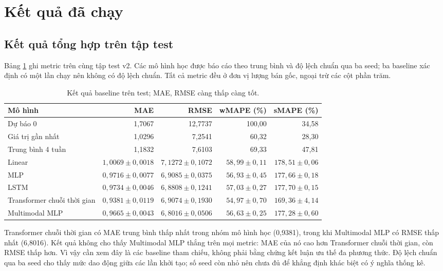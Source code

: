 \documentclass[12pt,a4paper,oneside]{article}
\begin{document}
\section{Kết quả đã chạy}
\subsection{Kết quả tổng hợp trên tập test}
Bảng \ref{tab:baseline} ghi metric trên cùng tập test v2. Các mô hình học được báo cáo theo trung bình và độ lệch chuẩn qua ba seed; ba baseline xác định có một lần chạy nên không có độ lệch chuẩn. Tất cả metric đều ở đơn vị lượng bán gốc, ngoại trừ các cột phần trăm.

\begin{table}[!htbp]
\centering
\small
\caption{Kết quả baseline trên test; MAE, RMSE càng thấp càng tốt.}
\label{tab:baseline}
\begin{tabular}{lrrrr}
\toprule
Mô hình & MAE & RMSE & wMAPE (\%) & sMAPE (\%) \\
\midrule
Dự báo 0 & 1,7067 & 12,7737 & 100,00 & 34,58 \\
Giá trị gần nhất & 1,0296 & 7,2541 & 60,32 & 28,30 \\
Trung bình 4 tuần & 1,1832 & 7,6103 & 69,33 & 47,81 \\
Linear & $1,0069\pm0,0018$ & $7,1272\pm0,1072$ & $58,99\pm0,11$ & $178,51\pm0,06$ \\
MLP & $0,9716\pm0,0077$ & $6,9085\pm0,0375$ & $56,93\pm0,45$ & $177,66\pm0,18$ \\
LSTM & $0,9734\pm0,0046$ & $6,8808\pm0,1241$ & $57,03\pm0,27$ & $177,70\pm0,15$ \\
Transformer chuỗi thời gian & $0,9381\pm0,0119$ & $6,9074\pm0,1930$ & $54,97\pm0,70$ & $169,36\pm4,14$ \\
Multimodal MLP & $0,9665\pm0,0043$ & $6,8016\pm0,0506$ & $56,63\pm0,25$ & $177,28\pm0,60$ \\
\bottomrule
\end{tabular}
\end{table}

Transformer chuỗi thời gian có MAE trung bình thấp nhất trong nhóm mô hình học (0,9381), trong khi Multimodal MLP có RMSE thấp nhất (6,8016). Kết quả không cho thấy Multimodal MLP thắng trên mọi metric: MAE của nó cao hơn Transformer chuỗi thời gian, còn RMSE thấp hơn. Vì vậy cần xem đây là các baseline tham chiếu, không phải bằng chứng kết luận ưu thế đa phương thức. Độ lệch chuẩn qua ba seed cho thấy mức dao động giữa các lần khởi tạo; số seed còn nhỏ nên chưa đủ để khẳng định khác biệt có ý nghĩa thống kê.
\end{document}
